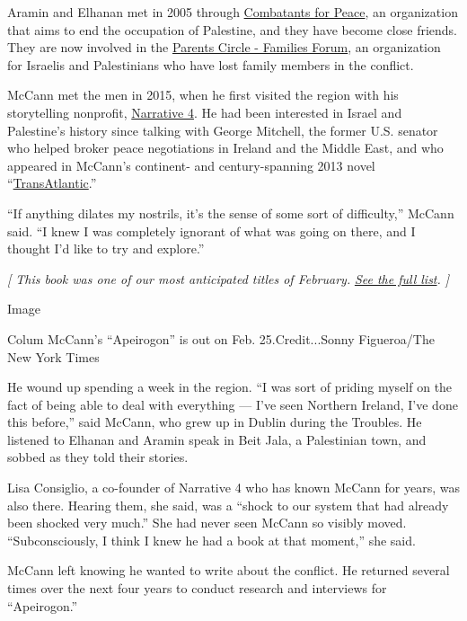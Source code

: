 Aramin and Elhanan met in 2005 through
\href{https://cfpeace.org/}{Combatants for Peace}, an organization that
aims to end the occupation of Palestine, and they have become close
friends. They are now involved in the
\href{https://www.theparentscircle.org/en/pcff-home-page-en/}{Parents
Circle - Families Forum}, an organization for Israelis and Palestinians
who have lost family members in the conflict.

McCann met the men in 2015, when he first visited the region with his
storytelling nonprofit, \href{https://narrative4.com/}{Narrative 4}. He
had been interested in Israel and Palestine's history since talking with
George Mitchell, the former U.S. senator who helped broker peace
negotiations in Ireland and the Middle East, and who appeared in
McCann's continent- and century-spanning 2013 novel
``\href{https://www.nytimes3xbfgragh.onion/2013/06/23/books/review/transatlantic-by-colum-mccann.html}{TransAtlantic}.''

``If anything dilates my nostrils, it's the sense of some sort of
difficulty,'' McCann said. ``I knew I was completely ignorant of what
was going on there, and I thought I'd like to try and explore.''

\emph{{[} This book was one of our most anticipated titles of February.}
\href{https://www.nytimes3xbfgragh.onion/2020/01/29/books/new-february-books.html}{\emph{See
the full list}}\emph{. {]}}

Image

Colum McCann's ``Apeirogon'' is out on Feb. 25.Credit...Sonny
Figueroa/The New York Times

He wound up spending a week in the region. ``I was sort of priding
myself on the fact of being able to deal with everything --- I've seen
Northern Ireland, I've done this before,'' said McCann, who grew up in
Dublin during the Troubles. He listened to Elhanan and Aramin speak in
Beit Jala, a Palestinian town, and sobbed as they told their stories.

Lisa Consiglio, a co-founder of Narrative 4 who has known McCann for
years, was also there. Hearing them, she said, was a ``shock to our
system that had already been shocked very much.'' She had never seen
McCann so visibly moved. ``Subconsciously, I think I knew he had a book
at that moment,'' she said.

McCann left knowing he wanted to write about the conflict. He returned
several times over the next four years to conduct research and
interviews for ``Apeirogon.''

